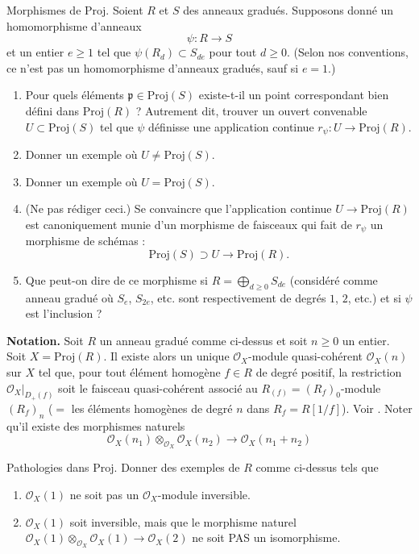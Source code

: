 \begin{exercise}
\label{exercise-morphism-proj}
Morphismes de $\text{Proj}$. Soient $R$ et $S$ des anneaux gradués.
Supposons donné un homomorphisme d'anneaux
$$
\psi : R \to S
$$
et un entier $e \geq 1$ tel que $\psi(R_d) \subset S_{de}$
pour tout $d \geq 0$. (Selon nos conventions, ce n'est pas un homomorphisme
d'anneaux gradués, sauf si $e = 1$.)
\begin{enumerate}
\item Pour quels éléments $\mathfrak p \in \text{Proj}(S)$ existe-t-il
un point correspondant bien défini dans $\text{Proj}(R)$ ? Autrement dit,
trouver un ouvert convenable $U \subset \text{Proj}(S)$ tel que $\psi$ définisse
une application continue $r_\psi : U \to \text{Proj}(R)$.
\item Donner un exemple où $U \not = \text{Proj}(S)$.
\item Donner un exemple où $U = \text{Proj}(S)$.
\item (Ne pas rédiger ceci.) Se convaincre que
l'application continue $U \to \text{Proj}(R)$ est canoniquement munie
d'un morphisme de faisceaux qui fait de $r_\psi$ un morphisme de schémas :
$$
\text{Proj}(S) \supset U \longrightarrow \text{Proj}(R).
$$
\item Que peut-on dire de ce morphisme si
$R = \bigoplus_{d \geq 0} S_{de}$ (considéré comme anneau gradué où
$S_e$, $S_{2e}$, etc. sont respectivement de degrés $1$, $2$, etc.) et si $\psi$
est l'inclusion ?
\end{enumerate}
\end{exercise}

\noindent
{\bf Notation.} Soit $R$ un anneau gradué comme ci-dessus et
soit $n \geq 0$ un entier. Soit $X = \text{Proj}(R)$. Il existe alors un unique
${\mathcal O}_X$-module quasi-cohérent ${\mathcal O}_X(n)$ sur $X$ tel que,
pour tout élément homogène $f \in R$ de degré positif, la restriction
${\mathcal O}_X |_{D_{+}(f)}$ soit le faisceau quasi-cohérent associé au
$R_{(f)} = (R_f)_0$-module $(R_f)_n$ ($ = $ les éléments homogènes de degré
$n$ dans $R_f = R[1/f]$). Voir \cite[page 116+]{H}. Noter qu'il existe
des morphismes naturels
$$
{\mathcal O}_X(n_1) \otimes_{{\mathcal O}_X} {\mathcal O}_X(n_2)
\longrightarrow
{\mathcal O}_X(n_1 + n_2)
$$

\begin{exercise}
\label{exercise-pathologies-proj}
Pathologies dans $\text{Proj}$.
Donner des exemples de $R$ comme ci-dessus tels que
\begin{enumerate}
\item ${\mathcal O}_X(1)$ ne soit pas un ${\mathcal O}_X$-module inversible.
\item ${\mathcal O}_X(1)$ soit inversible, mais que le
morphisme naturel ${\mathcal O}_X(1) \otimes_{{\mathcal O}_X} {\mathcal O}_X(1) \to
{\mathcal O}_X(2)$ ne soit PAS un isomorphisme.
\end{enumerate}
\end{exercise}

